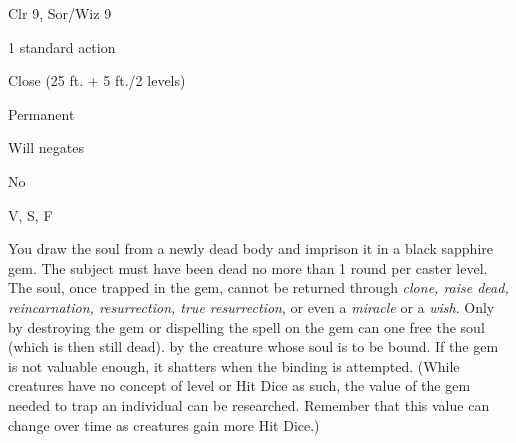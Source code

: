 
\begin{description*}
\item[Level:] Clr 9, Sor/Wiz 9
\item[Casting Time:] 1 standard action
\item[Range:] Close (25 ft. + 5 ft./2 levels)
\item[Duration:] Permanent
\item[Saving Throw:] Will negates
\item[Spell Resistance:] No
\item[Components:] V, S, F
\end{description*}

You draw the soul from a newly dead body and imprison it in a black sapphire gem.
The subject must have been dead no more than 1 round per caster level. The soul,
once trapped in the gem, cannot be returned through \textit{clone, raise dead,
reincarnation, resurrection, true resurrection}, or even a \textit{miracle} or
a \textit{wish}. Only by destroying the gem or dispelling the spell on the gem
can one free the soul (which is then still dead).
by the creature whose soul is to be bound. If the gem is not valuable enough, it
shatters when the binding is attempted. (While creatures have no concept of level
or Hit Dice as such, the value of the gem needed to trap an individual can be researched.
Remember that this value can change over time as creatures gain more Hit Dice.)